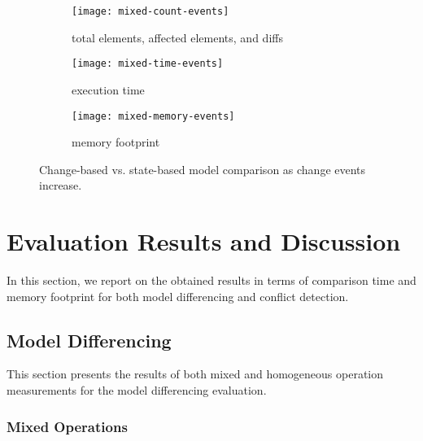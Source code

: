 \begin{figure*}[ht]
    \begin{subfigure}[]{0.33\linewidth}
        \texttt{[image: mixed-count-events]}
        \caption{total elements, affected elements, and diffs}
        \label{fig:modification_course}
    \end{subfigure}
    \begin{subfigure}[]{0.33\linewidth}
        \texttt{[image: mixed-time-events]}
        \caption{execution time}
        \label{fig:time_diffs}
    \end{subfigure}
    \begin{subfigure}[]{0.33\linewidth}
        \texttt{[image: mixed-memory-events]}
        \caption{memory footprint}
        \label{fig:memory_diffs}
    \end{subfigure}
    \caption{Change-based vs. state-based model comparison as change events increase.}
    \label{fig:change_vs_state}
\end{figure*}

\vspace{-5pt}
\section{Evaluation Results and Discussion}
\label{sec:discussion}
In this section, we report on the obtained results in terms of comparison time and memory footprint for both model differencing and conflict detection. 


\subsection{Model Differencing}
\label{sec:differencing_results}
This section presents the results of both mixed and homogeneous operation measurements for the model differencing evaluation. 

\vspace{-5pt}
\subsubsection{Mixed Operations} \label{sec:mixed-operation}

